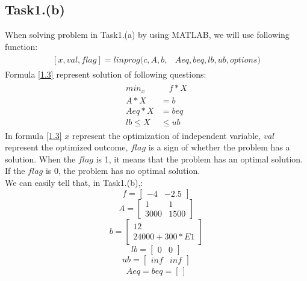 \documentclass{article}
\begin{document}
    \subsection{Task1.(b)}
        When solving problem in Task1.(a) by using MATLAB, we will use following function:
        \begin{align}\label{1.3}
        \begin{split}  
            [x,val,flag] = linprog(c,A,b,&Aeq,beq,lb,ub,options)
        \end{split}    
        \end{align}    
        Formula \eqref{1.3} represent solution of following questions:
        \begin{align}\label{1.4}
        \begin{split}  
            min_x &\quad f*X\\
            A*X &= b\\
            Aeq*X &= beq\\
            lb\leq X &\leq ub
        \end{split}    
        \end{align} 
        In formula \eqref{1.3} $x$ represent the optimization of independent variable, $val$ represent the optimized outcome, $flag$ is a sign of whether the problem has a solution. When the $flag$ is 1, it means that the problem has an optimal solution. If the $flag$ is 0, the problem has no optimal solution.\\
        We can easily tell that, in Task1.(b),:
        \[ f = \begin{bmatrix}\label{1.5}
        -4&-2.5
        \end{bmatrix}\]
        \[ A = \begin{bmatrix}\label{1.6}
        1&1\\
        3000&1500
        \end{bmatrix}\]
        \[ b = \begin{bmatrix}\label{1.7}
        12\\
        24000+300*E1
        \end{bmatrix}\]
        \[ lb = \begin{bmatrix}\label{1.8}
        0&0
        \end{bmatrix}\]
        \[ ub = \begin{bmatrix}\label{1.9}
        inf&inf
        \end{bmatrix}\]
        \begin{align}\label{1.10}
            Aeq = beq = [\,]
        \end{align} 
\end{document}
